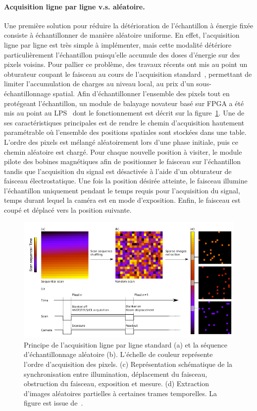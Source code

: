     \paragraph{Acquisition ligne par ligne v.s. aléatoire.} Une première solution pour réduire la détérioration de l'échantillon à énergie fixée consiste à échantillonner de manière aléatoire uniforme. En effet, l'acquisition ligne par ligne est très simple à implémenter, mais cette modalité détériore particulièrement l'échantillon puisqu'elle accumule des doses d'énergie sur des pixels voisins. Pour pallier ce problème, des travaux récents ont mis au point un obturateur coupant le faisceau au cours de l'acquisition standard~\cite{beche2016development}, permettant de limiter l'accumulation de charges au niveau local, au prix d'un sous-échantillonnage spatial. 
    Afin d'échantillonner l'ensemble des pixels tout en protégeant l'échantillon, un module de balayage novateur basé sur FPGA a été mis au point au LPS~\cite{tararan2016random, zobelli2019spatial, tence2019following} dont le fonctionnement est décrit sur la figure~\ref{fig-random-scan}. Une de ses caractéristiques principales est de rendre le chemin d'acquisition hautement paramétrable où l'ensemble des positions spatiales sont stockées dans une table. L'ordre des pixels est mélangé aléatoirement lors d'une phase initiale, puis ce chemin aléatoire est chargé. 
    Pour chaque nouvelle position à visiter, le module pilote des bobines magnétiques afin de positionner le faisceau sur l'échantillon tandis que l'acquisition du signal est désactivée à l'aide d'un obturateur de faisceau électrostatique. Une fois la position désirée atteinte, le faisceau illumine l’échantillon uniquement pendant le temps requis pour l’acquisition du signal, temps durant lequel la caméra est en mode d’exposition. Enfin, le faisceau est coupé et déplacé vers la position suivante.
    \begin{figure}[t]
        \centering
        \includegraphics[width=\textwidth]{img/chapitre1/figure18/random-scan-2}
        \caption{\protect\label{fig-random-scan}Principe de l'acquisition ligne par ligne standard (a) et la séquence d'échantillonnage aléatoire (b). L'échelle de couleur représente l'ordre d'acquisition des pixels. (c) Représentation schématique de la synchronisation entre illumination, déplacement du faisceau, obstruction du faisceau, exposition et mesure. (d) Extraction d'images aléatoires partielles à certaines trames temporelles. La figure est issue de~\cite{zobelli2019spatial}.}
    \end{figure}
